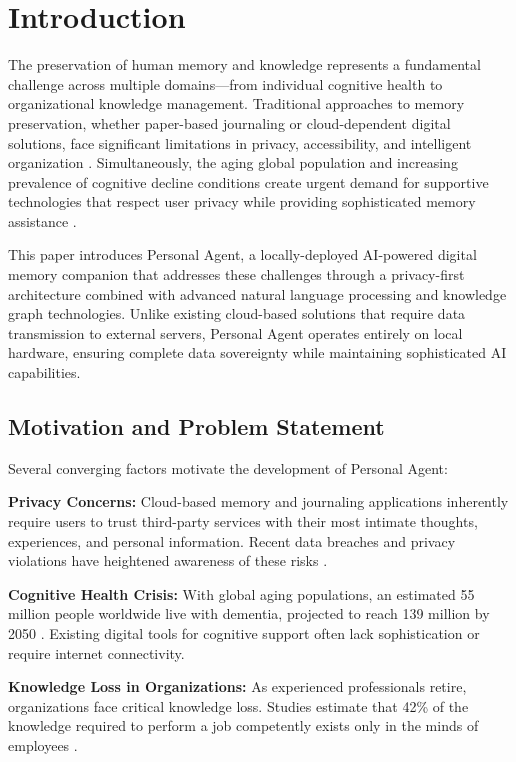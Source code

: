 \documentclass[11pt,letterpaper]{article}
\begin{document}
\newpage
\tableofcontents
\newpage

\section{Introduction}

The preservation of human memory and knowledge represents a fundamental challenge across multiple domains---from individual cognitive health to organizational knowledge management. Traditional approaches to memory preservation, whether paper-based journaling or cloud-dependent digital solutions, face significant limitations in privacy, accessibility, and intelligent organization \cite{placeholder}. Simultaneously, the aging global population and increasing prevalence of cognitive decline conditions create urgent demand for supportive technologies that respect user privacy while providing sophisticated memory assistance \cite{placeholder}.

This paper introduces Personal Agent, a locally-deployed AI-powered digital memory companion that addresses these challenges through a privacy-first architecture combined with advanced natural language processing and knowledge graph technologies. Unlike existing cloud-based solutions that require data transmission to external servers, Personal Agent operates entirely on local hardware, ensuring complete data sovereignty while maintaining sophisticated AI capabilities.

\subsection{Motivation and Problem Statement}

Several converging factors motivate the development of Personal Agent:

\textbf{Privacy Concerns:} Cloud-based memory and journaling applications inherently require users to trust third-party services with their most intimate thoughts, experiences, and personal information. Recent data breaches and privacy violations have heightened awareness of these risks \cite{placeholder}.

\textbf{Cognitive Health Crisis:} With global aging populations, an estimated 55 million people worldwide live with dementia, projected to reach 139 million by 2050 \cite{placeholder}. Existing digital tools for cognitive support often lack sophistication or require internet connectivity.

\textbf{Knowledge Loss in Organizations:} As experienced professionals retire, organizations face critical knowledge loss. Studies estimate that 42\% of the knowledge required to perform a job competently exists only in the minds of employees \cite{placeholder}.
\end{document}

